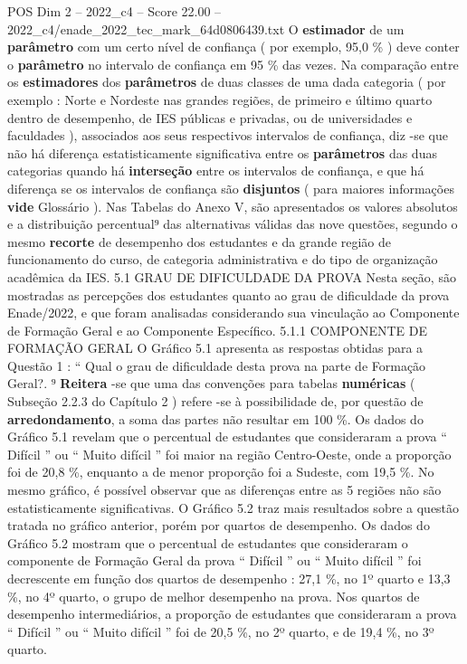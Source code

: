 \begin{textsample}{POS Dim 2 – 2022\_c4 – Score 22.00 – 2022\_c4/enade\_2022\_tec\_mark\_64d0806439.txt}
O \textbf{estimador} de um \textbf{parâmetro} com um certo nível de confiança ( por exemplo, 95,0 \% ) deve conter o \textbf{parâmetro} no intervalo de confiança em 95 \% das vezes.
Na comparação entre os \textbf{estimadores} dos \textbf{parâmetros} de duas classes de uma dada categoria ( por exemplo : Norte e Nordeste nas grandes regiões, de primeiro e último quarto dentro de desempenho, de IES públicas e privadas, ou de universidades e faculdades ), associados aos seus respectivos intervalos de confiança, diz -se que não há diferença estatisticamente significativa entre os \textbf{parâmetros} das duas categorias quando há \textbf{interseção} entre os intervalos de confiança, e que há diferença se os intervalos de confiança são \textbf{disjuntos} ( para maiores informações \textbf{vide} Glossário ).
Nas Tabelas do Anexo V, são apresentados os valores absolutos e a distribuição percentual⁹ das alternativas válidas das nove questões, segundo o mesmo \textbf{recorte} de desempenho dos estudantes e da grande região de funcionamento do curso, de categoria administrativa e do tipo de organização acadêmica da IES. 5.1 GRAU DE DIFICULDADE DA PROVA Nesta seção, são mostradas as percepções dos estudantes quanto ao grau de dificuldade da prova Enade/2022, e que foram analisadas considerando sua vinculação ao Componente de Formação Geral e ao Componente Específico. 5.1.1 COMPONENTE DE FORMAÇÃO GERAL O Gráfico 5.1 apresenta as respostas obtidas para a Questão 1 : “ Qual o grau de dificuldade desta prova na parte de Formação Geral?. ⁹ \textbf{Reitera} -se que uma das convenções para tabelas \textbf{numéricas} ( Subseção 2.2.3 do Capítulo 2 ) refere -se à possibilidade de, por questão de \textbf{arredondamento}, a soma das partes não resultar em 100 \%.
Os dados do Gráfico 5.1 revelam que o percentual de estudantes que consideraram a prova “ Difícil ” ou “ Muito difícil ” foi maior na região Centro-Oeste, onde a proporção foi de 20,8 \%, enquanto a de menor proporção foi a Sudeste, com 19,5 \%.
No mesmo gráfico, é possível observar que as diferenças entre as 5 regiões não são estatisticamente significativas.
O Gráfico 5.2 traz mais resultados sobre a questão tratada no gráfico anterior, porém por quartos de desempenho.
Os dados do Gráfico 5.2 mostram que o percentual de estudantes que consideraram o componente de Formação Geral da prova “ Difícil ” ou “ Muito difícil ” foi decrescente em função dos quartos de desempenho : 27,1 \%, no 1º quarto e 13,3 \%, no 4º quarto, o grupo de melhor desempenho na prova.
Nos quartos de desempenho intermediários, a proporção de estudantes que consideraram a prova “ Difícil ” ou “ Muito difícil ” foi de 20,5 \%, no 2º quarto, e de 19,4 \%, no 3º quarto.

\end{textsample}
